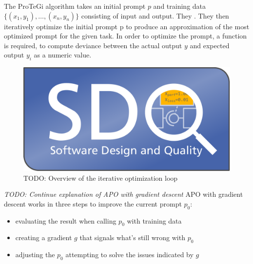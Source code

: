 The ProTeGi algorithm takes an initial prompt $p$ and training data $\{(x_1, y_1), \dots, (x_n, y_n)\}$ consisting of input and output. They . They then iteratively optimize the initial prompt p to produce an approximation of the most optimized prompt for the given task. In order to optimize the prompt, a function is required, to compute deviance between the actual output $y$ and expected output $y_i$ as a numeric value.

\begin{figure}[h]
\centering
\includegraphics[width=12cm]{logos/sdqlogo}
\caption{TODO: Overview of the iterative optimization loop}
\label{fig:sdqlogo}
\end{figure}

\textit{TODO: Continue explanation of APO with gradient descent}
APO with gradient descent works in three steps to improve the current prompt $p_0$:
\begin{itemize}
    \item evaluating the result when calling $p_0$ with training data
    \item creating a gradient $g$ that signals what's still wrong with $p_0$
    \item adjusting the $p_0$ attempting to solve the issues indicated by $g$
\end{itemize}